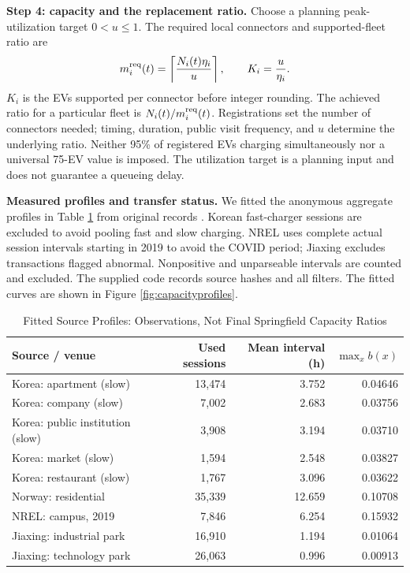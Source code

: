 \documentclass[12pt]{article}
\begin{document}
\textbf{Step 4: capacity and the replacement ratio.} Choose a planning peak-utilization
target $0<u\le1$. The required local connectors and supported-fleet ratio are
\begin{equation}
m_i^{\rm req}(t)=\left\lceil\frac{N_i(t)\eta_i}{u}\right\rceil,
\qquad K_i=\frac{u}{\eta_i}.
\label{eq:connectorcapacity}
\end{equation}
$K_i$ is the EVs supported per connector before integer rounding. The achieved ratio
for a particular fleet is $N_i(t)/m_i^{\rm req}(t)$. Registrations set the number of
connectors needed; timing, duration, public visit frequency, and $u$ determine the
underlying ratio. Neither 95\% of registered EVs charging simultaneously nor a
universal 75-EV value is imposed. The utilization target is a planning input and does
not guarantee a queueing delay.

\textbf{Measured profiles and transfer status.} We fitted the anonymous aggregate
profiles in Table \ref{tab:capacitysources} from original records
\cite{KoreaCharging2024,NorwayCharging,NRELWorkplace,JiaxingCharging2025}.
Korean fast-charger sessions are excluded to avoid pooling fast and slow charging.
NREL uses complete actual session intervals starting in 2019 to avoid the COVID period;
Jiaxing excludes transactions flagged abnormal. Nonpositive and unparseable intervals
are counted and excluded. The supplied code records source hashes and all filters.
The fitted curves are shown in Figure \ref{fig:capacityprofiles}.

\begin{table}[H]
\centering
\caption{Fitted Source Profiles: Observations, Not Final Springfield Capacity Ratios}
\label{tab:capacitysources}
\small
\begin{tabular}{@{}lrrr@{}}
\toprule
Source / venue & Used sessions & Mean interval (h) & $\max_x b(x)$ \\
\midrule
Korea: apartment (slow) & 13,474 & 3.752 & 0.04646 \\
Korea: company (slow) & 7,002 & 2.683 & 0.03756 \\
Korea: public institution (slow) & 3,908 & 3.194 & 0.03710 \\
Korea: market (slow) & 1,594 & 2.548 & 0.03827 \\
Korea: restaurant (slow) & 1,767 & 3.096 & 0.03622 \\
Norway: residential & 35,339 & 12.659 & 0.10708 \\
NREL: campus, 2019 & 7,846 & 6.254 & 0.15932 \\
Jiaxing: industrial park & 16,910 & 1.194 & 0.01064 \\
Jiaxing: technology park & 26,063 & 0.996 & 0.00913 \\
\bottomrule
\end{tabular}
\end{table}
\end{document}
